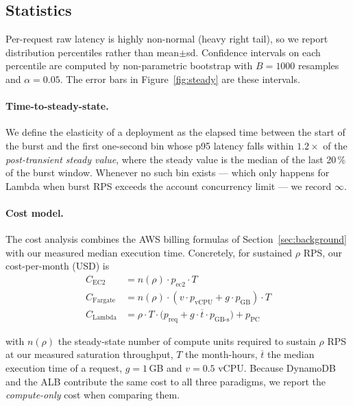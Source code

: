 \subsection{Statistics}

Per-request raw latency is highly non-normal (heavy right tail), so we
report distribution percentiles rather than mean$\pm$sd. Confidence
intervals on each percentile are computed by non-parametric bootstrap
with $B{=}1000$ resamples and $\alpha{=}0.05$. The error bars in
Figure~\ref{fig:steady} are these intervals.

\paragraph{Time-to-steady-state.} We define the elasticity of a
deployment as the elapsed time between the start of the burst and the
first one-second bin whose p95 latency falls within $1.2\times$ of the
\emph{post-transient steady value}, where the steady value is the
median of the last 20\,\% of the burst window. Whenever no such bin
exists --- which only happens for Lambda when burst RPS exceeds the
account concurrency limit --- we record $\infty$.

\paragraph{Cost model.} The cost analysis combines the AWS billing
formulas of Section~\ref{sec:background} with our measured median execution
time. Concretely, for sustained $\rho$ RPS, our cost-per-month
(USD) is
\begin{equation}
\label{eq:cost}
\begin{aligned}
C_{\text{EC2}}      &= n(\rho)\cdot p_{\text{ec2}}\cdot T \\
C_{\text{Fargate}}  &= n(\rho)\cdot (v\cdot p_{\text{vCPU}} + g\cdot p_{\text{GB}})\cdot T \\
C_{\text{Lambda}}   &= \rho\cdot T\cdot
                       \bigl(p_{\text{req}} + g\cdot \overline{t}\cdot p_{\text{GB-s}}\bigr) + p_{\text{PC}}
\end{aligned}
\end{equation}

with $n(\rho)$ the steady-state number of compute units required to
sustain $\rho$ RPS at our measured saturation throughput, $T$ the
month-hours, $\overline{t}$ the median execution time of a request,
$g{=}1$\,GB and $v{=}0.5$ vCPU. Because DynamoDB and the ALB
contribute the same cost to all three paradigms, we report the
\emph{compute-only} cost when comparing them.
